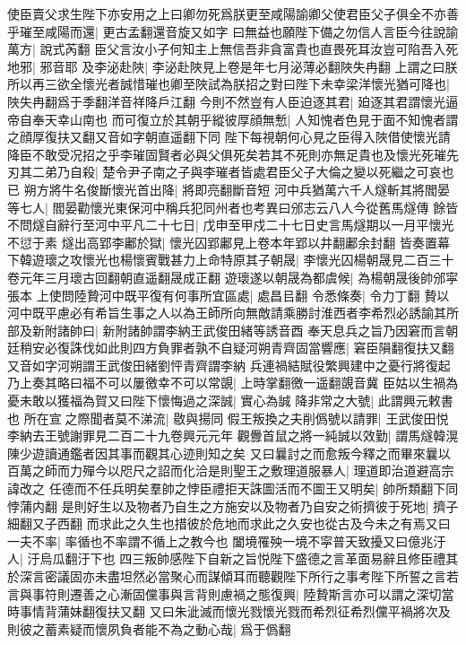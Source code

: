 使臣賣父求生陛下亦安用之上曰卿勿死爲朕更至咸陽諭卿父使君臣父子俱全不亦善乎璀至咸陽而還|{
	更古孟翻還音旋又如字}
曰無益也願陛下備之勿信人言臣今往說諭萬方|{
	說式芮翻}
臣父言汝小子何知主上無信吾非貪富貴也直畏死耳汝豈可陷吾入死地邪|{
	邪音耶}
及李泌赴陜|{
	李泌赴陜見上卷是年七月泌薄必翻陜失冉翻}
上謂之曰朕所以再三欲全懷光者誠惜璀也卿至陜試為朕招之對曰陛下未幸梁洋懷光猶可降也|{
	陜失冉翻爲于季翻洋音祥降戶江翻}
今則不然豈有人臣迫逐其君|{
	廹逐其君謂懷光逼帝自奉天幸山南也}
而可復立於其朝乎縱彼厚顔無慙|{
	人知愧者色見于面不知愧者謂之顔厚復扶又翻又音如字朝直遥翻下同}
陛下每視朝何心見之臣得入陜借使懷光請降臣不敢受况招之乎李璀固賢者必與父俱死矣若其不死則亦無足貴也及懷光死璀先刃其二弟乃自殺|{
	楚令尹子南之子與李璀者皆處君臣父子大倫之變以死繼之可哀也已}
朔方將牛名俊斷懷光首出降|{
	將即亮翻斷音短}
河中兵猶萬六千人燧斬其將閻晏等七人|{
	閻晏勸懷光東保河中稱兵犯同州者也考異曰邠志云八人今從舊馬燧傳}
餘皆不問燧自辭行至河中平凡二十七日|{
	戊申至甲戍二十七日史言馬燧期以一月平懷光不愆于素}
燧出高郢李鄘於獄|{
	懷光囚郢鄘見上卷本年郢以井翻鄘余封翻}
皆奏置幕下韓遊瓌之攻懷光也楊懷賓戰甚力上命特原其子朝晟|{
	李懷光囚楊朝晟見二百三十卷元年三月瓌古回翻朝直遥翻晟成正翻}
遊瓌遂以朝晟為都虞候|{
	為楊朝晟後帥邠寜張本}
上使問陸贄河中既平復有何事所宜區處|{
	處昌㠯翻}
令悉條奏|{
	令力丁翻}
贄以河中既平慮必有希旨生事之人以為王師所向無敵請乘勝討淮西者李希烈必誘諭其所部及新附諸帥曰|{
	新附諸帥謂李納王武俊田緒等誘音酉}
奉天息兵之旨乃因窘而言朝廷稍安必復誅伐如此則四方負罪者孰不自疑河朔青齊固當響應|{
	窘臣隕翻復扶又翻又音如字河朔謂王武俊田緒劉怦青齊謂李納}
兵連禍結賦役繁興建中之憂行將復起乃上奏其略曰福不可以屢徼幸不可以常覬|{
	上時掌翻徼一遥翻覬音冀}
臣姑以生禍為憂未敢以獲福為賀又曰陛下懷悔過之深誠|{
	實心為誠}
降非常之大號|{
	此謂興元敕書也}
所在宣之際聞者莫不涕流|{
	敭與揚同}
假王叛換之夫削僞號以請罪|{
	王武俊田悦李納去王號謝罪見二百二十九卷興元元年}
觀釁首鼠之將一純誠以效勤|{
	謂馬燧韓滉陳少遊讀通鑑者因其事而觀其心迹則知之矣}
又曰曩討之而愈叛今釋之而畢來曩以百萬之師而力殫今以咫尺之詔而化洽是則聖王之敷理道服暴人|{
	理道即治道避高宗諱改之}
任德而不任兵明矣羣帥之悖臣禮拒天誅圖活而不圖王又明矣|{
	帥所類翻下同悖蒲内翻}
是則好生以及物者乃自生之方施安以及物者乃自安之術擠彼于死地|{
	擠子細翻又子西翻}
而求此之久生也措彼於危地而求此之久安也從古及今未之有焉又曰一夫不率|{
	率循也不率謂不循上之教今也}
闔境罹殃一境不寜普天致擾又曰億兆汙人|{
	汙烏瓜翻汙下也}
四三叛帥感陛下自新之旨悦陛下盛德之言革面易辭且修臣禮其於深言密議固亦未盡坦然必當聚心而謀傾耳而聽觀陛下所行之事考陛下所誓之言若言與事符則遷善之心漸固儻事與言背則慮禍之態復興|{
	陸贄斯言亦可以謂之深切當時事情背蒲妹翻復扶又翻}
又曰朱泚滅而懷光戮懷光戮而希烈征希烈儻平禍將次及則彼之蓄素疑而懷夙負者能不為之動心哉|{
	爲于僞翻}
